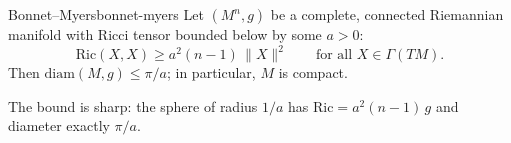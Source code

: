 












\begin{colortheo}{Bonnet--Myers}{bonnet-myers}
Let $(M^n, g)$ be a complete, connected Riemannian manifold with Ricci tensor bounded below by some $a > 0$:
\[
\mathrm{Ric}(X, X) \geqslant a^2 (n - 1)\, \|X\|^2 \qquad \text{for all } X \in \Gamma(TM).
\]
Then $\mathrm{diam}(M, g) \leqslant \pi/a$; in particular, $M$ is compact.
\end{colortheo}

\begin{colremark}
The bound is sharp: the sphere of radius $1/a$ has $\mathrm{Ric} = a^2(n - 1)\, g$ and diameter exactly $\pi/a$.
\end{colremark}
